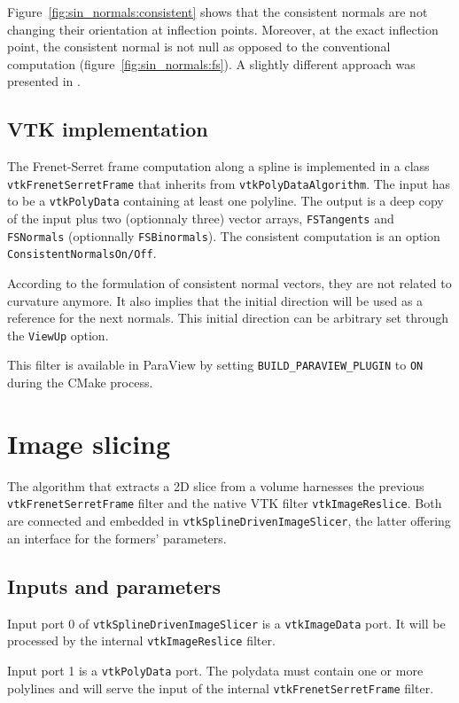 \documentclass{InsightArticle}
\begin{document}
Figure~\ref{fig:sin_normals:consistent} shows that the consistent normals are
not changing their orientation at inflection points. Moreover, at the exact
inflection point, the consistent normal is not null as opposed to the 
conventional computation (figure~\ref{fig:sin_normals:fs}). A slightly 
different approach was presented in \cite{KLO86.1}.
%
\subsection{VTK implementation}
%
The Frenet-Serret frame computation along a spline is implemented in a class
\verb!vtkFrenetSerretFrame! that inherits from \verb!vtkPolyDataAlgorithm!.
The input has to be a \verb!vtkPolyData! containing at least one polyline. The 
output is a deep copy of the input plus two (optionnaly three) vector arrays, 
\verb!FSTangents! and \verb!FSNormals! (optionnally \verb!FSBinormals!). The
consistent computation is an option \verb!ConsistentNormalsOn/Off!.

According to the formulation of consistent normal vectors, they are not related
to curvature anymore. It also implies that the initial direction will be used
as a reference for the next normals. This initial direction can be arbitrary
set through the \verb!ViewUp! option.

This filter is available in ParaView by setting \verb!BUILD_PARAVIEW_PLUGIN! to
\verb!ON! during the CMake process.
%
\section{Image slicing}
%
The algorithm that extracts a 2D slice from a volume harnesses the previous
\verb!vtkFrenetSerretFrame! filter and the native VTK filter 
\verb!vtkImageReslice!. Both are connected and embedded in 
\verb!vtkSplineDrivenImageSlicer!, the latter offering an interface for the
formers' parameters.
%
\subsection{Inputs and parameters}
%
Input port 0 of \verb!vtkSplineDrivenImageSlicer! is a \verb|vtkImageData| port.
It will be
processed by the internal \verb!vtkImageReslice! filter.

Input port 1 is a \verb|vtkPolyData| port. The polydata must contain one or more
polylines and
will serve the input of the internal \verb!vtkFrenetSerretFrame! filter.
\end{document}
